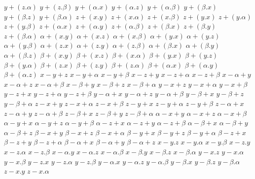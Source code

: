 $ y + (z . \alpha) $
$ y + (z . \beta) $
$ y + (\alpha . x) $
$ y + (\alpha . z) $
$ y + (\alpha . \beta) $
$ y + (\beta . x) $
$ y + (\beta . z) $
$ y + (\beta . \alpha) $
$ z + (x . y) $
$ z + (x . \alpha) $
$ z + (x . \beta) $
$ z + (y . x) $
$ z + (y . \alpha) $
$ z + (y . \beta) $
$ z + (\alpha . x) $
$ z + (\alpha . y) $
$ z + (\alpha . \beta) $
$ z + (\beta . x) $
$ z + (\beta . y) $
$ z + (\beta . \alpha) $
$ \alpha + (x . y) $
$ \alpha + (x . z) $
$ \alpha + (x . \beta) $
$ \alpha + (y . x) $
$ \alpha + (y . z) $
$ \alpha + (y . \beta) $
$ \alpha + (z . x) $
$ \alpha + (z . y) $
$ \alpha + (z . \beta) $
$ \alpha + (\beta . x) $
$ \alpha + (\beta . y) $
$ \alpha + (\beta . z) $
$ \beta + (x . y) $
$ \beta + (x . z) $
$ \beta + (x . \alpha) $
$ \beta + (y . x) $
$ \beta + (y . z) $
$ \beta + (y . \alpha) $
$ \beta + (z . x) $
$ \beta + (z . y) $
$ \beta + (z . \alpha) $
$ \beta + (\alpha . x) $
$ \beta + (\alpha . y) $
$ \beta + (\alpha . z) $
$ x - y + z $
$ x - y + \alpha $
$ x - y + \beta $
$ x - z + y $
$ x - z + \alpha $
$ x - z + \beta $
$ x - \alpha + y $
$ x - \alpha + z $
$ x - \alpha + \beta $
$ x - \beta + y $
$ x - \beta + z $
$ x - \beta + \alpha $
$ y - x + z $
$ y - x + \alpha $
$ y - x + \beta $
$ y - z + x $
$ y - z + \alpha $
$ y - z + \beta $
$ y - \alpha + x $
$ y - \alpha + z $
$ y - \alpha + \beta $
$ y - \beta + x $
$ y - \beta + z $
$ y - \beta + \alpha $
$ z - x + y $
$ z - x + \alpha $
$ z - x + \beta $
$ z - y + x $
$ z - y + \alpha $
$ z - y + \beta $
$ z - \alpha + x $
$ z - \alpha + y $
$ z - \alpha + \beta $
$ z - \beta + x $
$ z - \beta + y $
$ z - \beta + \alpha $
$ \alpha - x + y $
$ \alpha - x + z $
$ \alpha - x + \beta $
$ \alpha - y + x $
$ \alpha - y + z $
$ \alpha - y + \beta $
$ \alpha - z + x $
$ \alpha - z + y $
$ \alpha - z + \beta $
$ \alpha - \beta + x $
$ \alpha - \beta + y $
$ \alpha - \beta + z $
$ \beta - x + y $
$ \beta - x + z $
$ \beta - x + \alpha $
$ \beta - y + x $
$ \beta - y + z $
$ \beta - y + \alpha $
$ \beta - z + x $
$ \beta - z + y $
$ \beta - z + \alpha $
$ \beta - \alpha + x $
$ \beta - \alpha + y $
$ \beta - \alpha + z $
$ x - y . z $
$ x - y . \alpha $
$ x - y . \beta $
$ x - z . y $
$ x - z . \alpha $
$ x - z . \beta $
$ x - \alpha . y $
$ x - \alpha . z $
$ x - \alpha . \beta $
$ x - \beta . y $
$ x - \beta . z $
$ x - \beta . \alpha $
$ y - x . z $
$ y - x . \alpha $
$ y - x . \beta $
$ y - z . x $
$ y - z . \alpha $
$ y - z . \beta $
$ y - \alpha . x $
$ y - \alpha . z $
$ y - \alpha . \beta $
$ y - \beta . x $
$ y - \beta . z $
$ y - \beta . \alpha $
$ z - x . y $
$ z - x . \alpha $
